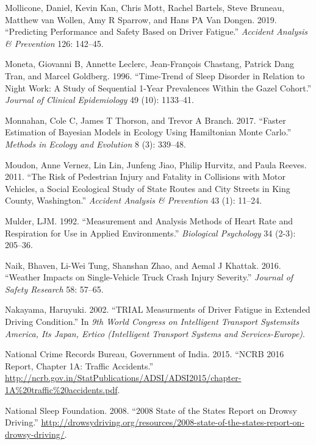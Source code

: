 \documentclass[12pt]{book}
\numberwithin{equation}{chapter}
\begin{document}
\leavevmode\hypertarget{ref-mollicone2019predicting}{}%
Mollicone, Daniel, Kevin Kan, Chris Mott, Rachel Bartels, Steve Bruneau, Matthew van Wollen, Amy R Sparrow, and Hans PA Van Dongen. 2019. ``Predicting Performance and Safety Based on Driver Fatigue.'' \emph{Accident Analysis \& Prevention} 126: 142--45.

\leavevmode\hypertarget{ref-moneta1996time}{}%
Moneta, Giovanni B, Annette Leclerc, Jean-François Chastang, Patrick Dang Tran, and Marcel Goldberg. 1996. ``Time-Trend of Sleep Disorder in Relation to Night Work: A Study of Sequential 1-Year Prevalences Within the Gazel Cohort.'' \emph{Journal of Clinical Epidemiology} 49 (10): 1133--41.

\leavevmode\hypertarget{ref-monnahan2017faster}{}%
Monnahan, Cole C, James T Thorson, and Trevor A Branch. 2017. ``Faster Estimation of Bayesian Models in Ecology Using Hamiltonian Monte Carlo.'' \emph{Methods in Ecology and Evolution} 8 (3): 339--48.

\leavevmode\hypertarget{ref-moudon2011risk}{}%
Moudon, Anne Vernez, Lin Lin, Junfeng Jiao, Philip Hurvitz, and Paula Reeves. 2011. ``The Risk of Pedestrian Injury and Fatality in Collisions with Motor Vehicles, a Social Ecological Study of State Routes and City Streets in King County, Washington.'' \emph{Accident Analysis \& Prevention} 43 (1): 11--24.

\leavevmode\hypertarget{ref-mulder1992measurement}{}%
Mulder, LJM. 1992. ``Measurement and Analysis Methods of Heart Rate and Respiration for Use in Applied Environments.'' \emph{Biological Psychology} 34 (2-3): 205--36.

\leavevmode\hypertarget{ref-naik2016weather}{}%
Naik, Bhaven, Li-Wei Tung, Shanshan Zhao, and Aemal J Khattak. 2016. ``Weather Impacts on Single-Vehicle Truck Crash Injury Severity.'' \emph{Journal of Safety Research} 58: 57--65.

\leavevmode\hypertarget{ref-nakayama2002trial}{}%
Nakayama, Haruyuki. 2002. ``TRIAL Measurments of Driver Fatigue in Extended Driving Condition.'' In \emph{9th World Congress on Intelligent Transport Systemsits America, Its Japan, Ertico (Intelligent Transport Systems and Services-Europe)}.

\leavevmode\hypertarget{ref-india2015}{}%
National Crime Records Bureau, Government of India. 2015. ``NCRB 2016 Report, Chapter 1A: Traffic Accidents.'' \url{http://ncrb.gov.in/StatPublications/ADSI/ADSI2015/chapter-1A\%20traffic\%20accidents.pdf}.

\leavevmode\hypertarget{ref-nsleepf}{}%
National Sleep Foundation. 2008. ``2008 State of the States Report on Drowsy Driving.'' \url{http://drowsydriving.org/resources/2008-state-of-the-states-report-on-drowsy-driving/}.
\end{document}
